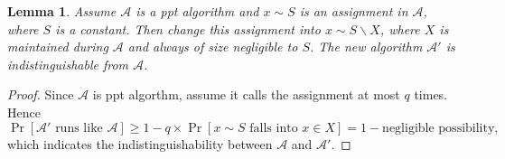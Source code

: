 \documentclass[a4paper]{article}
\newtheorem{lemma}{Lemma}
\newtheorem*{proof}{Proof}
\newcommand{\sbra}[1]{\left[ #1 \right]}
\newcommand{\ppt}{{\sc ppt} }
\begin{document}
\begin{lemma}\label{ap}
    Assume $\mathcal A$ is a \ppt algorithm and $x\sim S$ is an assignment in $\mathcal A$, where $S$ is a constant.
    Then change this assignment into $x\sim S\backslash X$, where $X$ is maintained during $\mathcal A$ 
    and always of size negligible to $S$.
    The new algorithm $\mathcal A'$ is indistinguishable from $\mathcal A$.
\end{lemma}
\begin{proof}
    Since $\mathcal A$ is \ppt algorthm, assume it calls the assignment at most $q$ times.
    Hence
    $$
        \Pr\sbra{\mathcal A'\text{ runs like }\mathcal A}\geq
            1-q\times \Pr\sbra{\text{$x\sim S$ falls into $x\in X$}}=1-\text{negligible possibility},
    $$
    which indicates the indistinguishability between $\mathcal A$ and $\mathcal A'$. 
\end{proof}
\end{document}
